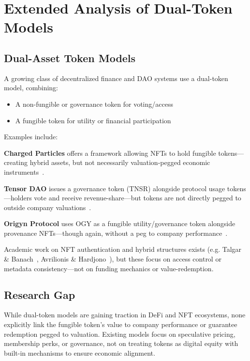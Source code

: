 \documentclass[conference]{IEEEtran}
\begin{document}
\section{Extended Analysis of Dual-Token Models}

\subsection{Dual-Asset Token Models}

A growing class of decentralized finance and DAO systems use a dual-token model, combining:

\begin{itemize}
    \item A non-fungible or governance token for voting/access
    \item A fungible token for utility or financial participation
\end{itemize}

Examples include:

\textbf{Charged Particles} offers a framework allowing NFTs to hold fungible tokens—creating hybrid assets, but not necessarily valuation‑pegged economic instruments~\cite{chargedparticles2022}.

\textbf{Tensor DAO} issues a governance token (TNSR) alongside protocol usage tokens—holders vote and receive revenue-share—but tokens are not directly pegged to outside company valuations~\cite{tensor2025}.

\textbf{Origyn Protocol} uses OGY as a fungible utility/governance token alongside provenance NFTs—though again, without a peg to company performance~\cite{origyn2022}.

Academic work on NFT authentication and hybrid structures exists (e.g. Talgar \& Banach~\cite{talgar2024dao}, Avrilionis \& Hardjono~\cite{avrilionis2022assetproxy}), but these focus on access control or metadata consistency—not on funding mechanics or value-redemption.

\subsection{Research Gap}

While dual-token models are gaining traction in DeFi and NFT ecosystems, none explicitly link the fungible token’s value to company performance or guarantee redemption pegged to valuation. Existing models focus on speculative pricing, membership perks, or governance, not on treating tokens as digital equity with built-in mechanisms to ensure economic alignment.
\end{document}
